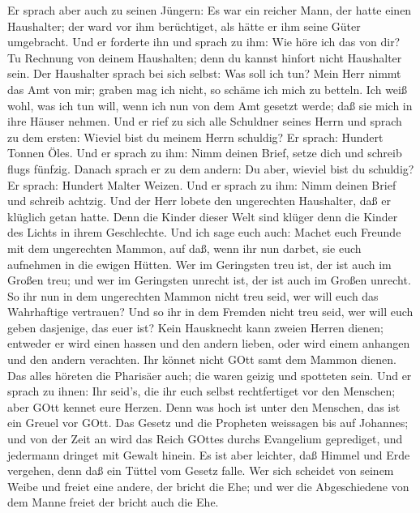  Er sprach aber auch zu seinen Jüngern: Es war ein reicher
Mann, der hatte einen Haushalter; der ward vor ihm berüchtiget, als
hätte er ihm seine Güter umgebracht.  Und er forderte ihn
und sprach zu ihm: Wie höre ich das von dir? Tu Rechnung von deinem
Haushalten; denn du kannst hinfort nicht Haushalter sein. 
Der Haushalter sprach bei sich selbst: Was soll ich tun? Mein Herr nimmt
das Amt von mir; graben mag ich nicht, so schäme ich mich zu betteln.
 Ich weiß wohl, was ich tun will, wenn ich nun von dem Amt
gesetzt werde; daß sie mich in ihre Häuser nehmen.  Und er
rief zu sich alle Schuldner seines Herrn und sprach zu dem ersten:
Wieviel bist du meinem Herrn schuldig?  Er sprach: Hundert
Tonnen Öles. Und er sprach zu ihm: Nimm deinen Brief, setze dich und
schreib flugs fünfzig.  Danach sprach er zu dem andern: Du
aber, wieviel bist du schuldig? Er sprach: Hundert Malter Weizen. Und er
sprach zu ihm: Nimm deinen Brief und schreib achtzig.  Und
der Herr lobete den ungerechten Haushalter, daß er klüglich getan hatte.
Denn die Kinder dieser Welt sind klüger denn die Kinder des Lichts in
ihrem Geschlechte.  Und ich sage euch auch: Machet euch
Freunde mit dem ungerechten Mammon, auf daß, wenn ihr nun darbet, sie
euch aufnehmen in die ewigen Hütten.  Wer im Geringsten
treu ist, der ist auch im Großen treu; und wer im Geringsten unrecht
ist, der ist auch im Großen unrecht.  So ihr nun in dem
ungerechten Mammon nicht treu seid, wer will euch das Wahrhaftige
vertrauen?  Und so ihr in dem Fremden nicht treu seid, wer
will euch geben dasjenige, das euer ist?  Kein Hausknecht
kann zweien Herren dienen; entweder er wird einen hassen und den andern
lieben, oder wird einem anhangen und den andern verachten. Ihr könnet
nicht GOtt samt dem Mammon dienen.  Das alles höreten die
Pharisäer auch; die waren geizig und spotteten sein.  Und
er sprach zu ihnen: Ihr seid's, die ihr euch selbst rechtfertiget vor
den Menschen; aber GOtt kennet eure Herzen. Denn was hoch ist unter den
Menschen, das ist ein Greuel vor GOtt.  Das Gesetz und die
Propheten weissagen bis auf Johannes; und von der Zeit an wird das Reich
GOttes durchs Evangelium geprediget, und jedermann dringet mit Gewalt
hinein.  Es ist aber leichter, daß Himmel und Erde
vergehen, denn daß ein Tüttel vom Gesetz falle.  Wer sich
scheidet von seinem Weibe und freiet eine andere, der bricht die Ehe;
und wer die Abgeschiedene von dem Manne freiet der bricht auch die Ehe.
